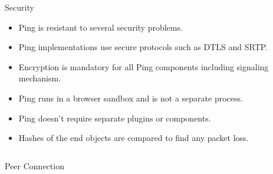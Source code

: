 \documentclass[final]{beamer}
\newlength{\onecolwid}
\newlength{\twocolwid}
\begin{document}
\begin{frame}[t]
\begin{columns}[t]
\begin{column}{\twocolwid}
\begin{columns}[t,totalwidth=\twocolwid]
\begin{column}{\onecolwid}
\begin{block}{Security}
\begin{itemize}
\item Ping is resistant to several security problems.
\item Ping implementations use secure protocols such as DTLS and SRTP.
\item Encryption is mandatory for all Ping components including signaling mechanism.
\item Ping runs in a browser sandbox and is not a separate process. 
\item Ping doesn't require separate plugins or components.
\item Hashes of the end objects are compared to find any packet loss.
\end{itemize}

\end{block}


\end{column} %

\end{columns} %





\begin{columns}[t,totalwidth=\twocolwid] %

\begin{column}{\onecolwid} %


\begin{block}{Peer Connection}


\end{block}
\end{column}
\end{columns}
\end{column}
\end{columns}
\end{frame}
\end{document}
